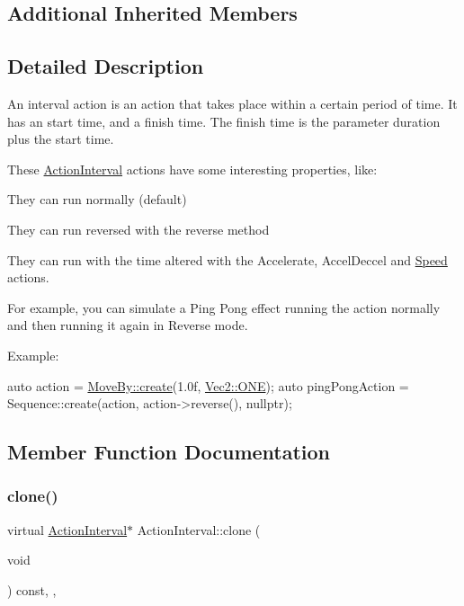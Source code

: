\subsection*{Additional Inherited Members}


\subsection{Detailed Description}
An interval action is an action that takes place within a certain period of time. It has an start time, and a finish time. The finish time is the parameter duration plus the start time. 

These \hyperlink{classActionInterval}{Action\+Interval} actions have some interesting properties, like\+:
\begin{DoxyItemize}
\item They can run normally (default)
\item They can run reversed with the reverse method
\item They can run with the time altered with the Accelerate, Accel\+Deccel and \hyperlink{classSpeed}{Speed} actions.
\end{DoxyItemize}

For example, you can simulate a Ping Pong effect running the action normally and then running it again in Reverse mode.

Example\+:


\begin{DoxyCode}
\textcolor{keyword}{auto} action = \hyperlink{classMoveBy_a4781fe85da740426582c34276557be5c}{MoveBy::create}(1.0f, \hyperlink{classVec2_a6b62ec70b5f9d4b6f78341a73b38d328}{Vec2::ONE});
\textcolor{keyword}{auto} pingPongAction = Sequence::create(action, action->reverse(), \textcolor{keyword}{nullptr});
\end{DoxyCode}
 

\subsection{Member Function Documentation}
\mbox{\label{classActionInterval_abc93ce0c2f54a90eb216a7803f25f44a}} 
\subsubsection{\texorpdfstring{clone()}{clone()}\hspace{0.1cm}{\footnotesize\ttfamily [1/2]}}
{\footnotesize\ttfamily virtual \hyperlink{classActionInterval}{Action\+Interval}$\ast$ Action\+Interval\+::clone (\begin{DoxyParamCaption}\item[{void}]{ }\end{DoxyParamCaption}) const\hspace{0.3cm}{\ttfamily [inline]}, {\ttfamily [override]}, {\ttfamily [virtual]}}

